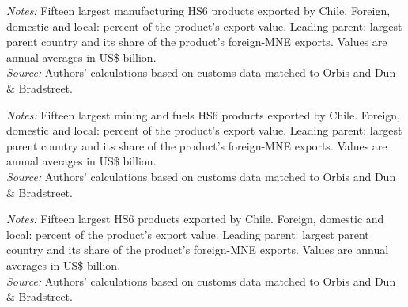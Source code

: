 \documentclass[11pt,a4paper]{article}
\begin{document}
\begin{table}[H]\centering\footnotesize%
  \caption{Chile, Manufacturing: Fifteen Largest Export Products}%
  \label{tab:c_hs6_CHL_manufacturing}%
  \par\vspace{3pt}%
  \begin{minipage}{0.95\textwidth}\footnotesize %
  \textit{Notes:} Fifteen largest manufacturing HS6 products exported by Chile. Foreign, domestic and local: percent of the product's export value. Leading parent: largest parent country and its share of the product's foreign-MNE exports. Values are annual averages in US\$ billion.\\[3pt]%
  \textit{Source:} Authors' calculations based on customs data matched to Orbis and Dun \& Bradstreet.%
  \end{minipage}%
  \end{table}
\begin{table}[H]\centering\footnotesize%
  \caption{Chile, Mining and Fuels: Fifteen Largest Export Products}%
  \label{tab:c_hs6_CHL_mining}%
  \par\vspace{3pt}%
  \begin{minipage}{0.95\textwidth}\footnotesize %
  \textit{Notes:} Fifteen largest mining and fuels HS6 products exported by Chile. Foreign, domestic and local: percent of the product's export value. Leading parent: largest parent country and its share of the product's foreign-MNE exports. Values are annual averages in US\$ billion.\\[3pt]%
  \textit{Source:} Authors' calculations based on customs data matched to Orbis and Dun \& Bradstreet.%
  \end{minipage}%
  \end{table}
\begin{table}[H]\centering\footnotesize%
  \caption{Chile, Other Goods: Fifteen Largest Export Products}%
  \label{tab:c_hs6_CHL_rest}%
  \par\vspace{3pt}%
  \begin{minipage}{0.95\textwidth}\footnotesize %
  \textit{Notes:} Fifteen largest HS6 products exported by Chile. Foreign, domestic and local: percent of the product's export value. Leading parent: largest parent country and its share of the product's foreign-MNE exports. Values are annual averages in US\$ billion.\\[3pt]%
  \textit{Source:} Authors' calculations based on customs data matched to Orbis and Dun \& Bradstreet.%
  \end{minipage}%
  \end{table}
\end{document}
